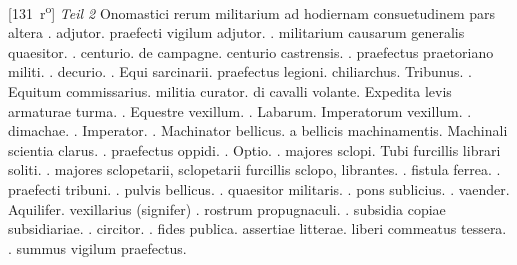 [131~r\textsuperscript{o}]
\pend%
\vspace*{8mm}%
\pstart%
\normalsize%
\noindent%
\centering%
\lbrack\textit{Teil 2}\rbrack%
\pend%
\vspace*{0.5em}%
\pstart%
\noindent%
\centering
Onomastici rerum militarium ad hodiernam consuetudinem pars altera
\pend%
\vspace*{0.5em}
\pstart%
. adjutor. praefecti vigilum adjutor.
\pend%
\pstart%
. militarium causarum generalis quaesitor.
\pend%
\pstart%
. centurio.
\pend%
\pstart%
 de campagne. centurio castrensis.
\pend%
\pstart%
. praefectus praetoriano militi.
\pend%
\pstart%
. decurio.
\pend%
\pstart%
. Equi sarcinarii.
\pend%
\pstart%
 praefectus legioni. chiliarchus. Tribunus.
\pend%
\pstart%
. Equitum commissarius.
militia curator.
\pend%
\pstart%
 di cavalli volante. Expedita levis armaturae turma.
\pend%
\pstart%
. Equestre vexillum.
\pend%
\pstart%
. Labarum. Imperatorum vexillum.
\pend%
\pstart%
. dimachae.
\pend%
\pstart%
. Imperator.
\pend%
\pstart%
. Machinator bellicus. a bellicis machinamentis. Machinali scientia clarus.
\pend%
\pstart%
. praefectus oppidi.
\pend%
\pstart%
. Optio.
\pend%
\pstart%
. majores sclopi. Tubi furcillis librari soliti.
\pend%
\pstart%
. majores sclopetarii, sclopetarii furcillis sclopo, librantes.
\pend%
\pstart%
. fistula ferrea.
\pend%
\pstart%
. praefecti tribuni.
\pend%
\pstart%
. pulvis bellicus.
\pend%
\pstart%
. quaesitor militaris.
\pend%
\pstart%
. pons sublicius.
\pend%
\pstart%
. vaender. Aquilifer. vexillarius (signifer)
\pend%
\pstart%
. rostrum propugnaculi.
\pend%
\pstart%
. subsidia copiae subsidiariae.
\pend%
\pstart%
. circitor.
\pend%
\pstart%
. fides publica. assertiae litterae. liberi commeatus tessera.
\pend%
\pstart%
. summus vigilum praefectus.
